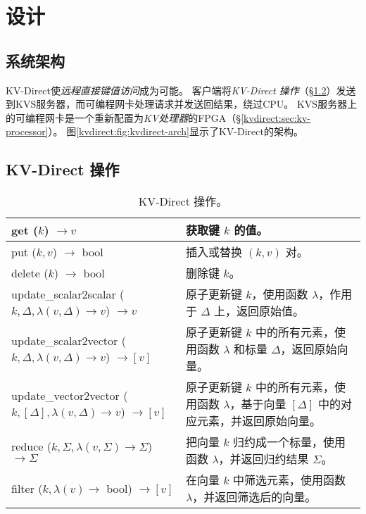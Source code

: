 \section{设计}
\label{kvdirect:sec:architecture}

\subsection{系统架构}

KV-Direct使\textit {远程直接键值访问}成为可能。
客户端将\textit {KV-Direct 操作}（\S \ref {kvdirect:sec:kv-operations}）发送到KVS服务器，而可编程网卡处理请求并发送回结果，绕过CPU。
KVS服务器上的可编程网卡是一个重新配置为\textit {KV处理器}的FPGA（\S \ref {kvdirect:sec:kv-processor}）。
图\ref {kvdirect:fig:kvdirect-arch}显示了KV-Direct的架构。

\subsection{KV-Direct 操作}
\label{kvdirect:sec:kv-operations}

\begin{table}
\centering
\caption{KV-Direct 操作。}
\label{kvdirect:tab:kv-operations}

\small
\begin{tabular}{p{}|p{} }
\toprule
get ($k$) $\rightarrow v$ & 获取键 $k$ 的值。 \\
\midrule
put ($k, v$) $\rightarrow$ bool & 插入或替换 $(k, v)$ 对。 \\
\midrule
delete ($k$) $\rightarrow$ bool & 删除键 $k$。 \\
\midrule
\midrule
update{\_}scalar2scalar ($k, \Delta, \lambda(v, \Delta) \rightarrow v$) $\rightarrow v$ & 原子更新键 $k$，使用函数 $\lambda$，作用于 $\Delta$ 上，返回原始值。\\
\midrule
update{\_}scalar2vector ($k, \Delta, \lambda(v, \Delta) \rightarrow v$) $\rightarrow [v]$ & 原子更新键 $k$ 中的所有元素，使用函数 $\lambda$ 和标量 $\Delta$，返回原始向量。 \\
\midrule
update{\_}vector2vector ($k, [\Delta], \lambda(v, \Delta) \rightarrow v$) $\rightarrow [v]$ & 原子更新键 $k$ 中的所有元素，使用函数 $\lambda$，基于向量 $[\Delta]$ 中的对应元素，并返回原始向量。 \\
\midrule
reduce ($k, \Sigma, \lambda(v, \Sigma) \rightarrow \Sigma$) $\rightarrow \Sigma$ & 把向量 $k$ 归约成一个标量，使用函数 $\lambda$，并返回归约结果 $\Sigma$。 \\
\midrule
filter ($k, \lambda(v) \rightarrow$ bool) $\rightarrow [v]$ & 在向量 $k$ 中筛选元素，使用函数 $\lambda$，并返回筛选后的向量。 \\
\bottomrule
\end{tabular}

\end{table}

